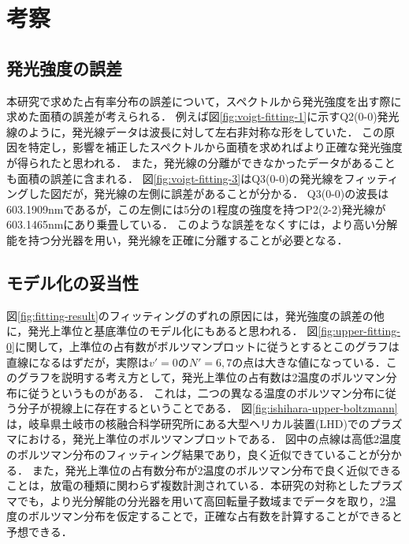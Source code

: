 \chapter{考察}

\section{発光強度の誤差}
本研究で求めた占有率分布の誤差について，スペクトルから発光強度を出す際に求めた面積の誤差が考えられる．
例えば図\ref{fig:voigt-fitting-1}に示すQ2(0-0)発光線のように，発光線データは波長に対して左右非対称な形をしていた．
この原因を特定し，影響を補正したスペクトルから面積を求めればより正確な発光強度が得られたと思われる．
また，発光線の分離ができなかったデータがあることも面積の誤差に含まれる．
図\ref{fig:voigt-fitting-3}はQ3(0-0)の発光線をフィッティングした図だが，発光線の左側に誤差があることが分かる．
Q3(0-0)の波長は603.1909nmであるが，この左側には5分の1程度の強度を持つP2(2-2)発光線が603.1465nmにあり乗畳している\cite{kyokaisou}．
このような誤差をなくすには，より高い分解能を持つ分光器を用い，発光線を正確に分離することが必要となる．

\section{モデル化の妥当性}
図\ref{fig:fitting-result}のフィッティングのずれの原因には，発光強度の誤差の他に，発光上準位と基底準位のモデル化にもあると思われる．
図\ref{fig:upper-fitting-0}に関して，上準位の占有数がボルツマンプロットに従うとするとこのグラフは直線になるはずだが，実際は$v'=0$の$N'=6,7$の点は大きな値になっている．このグラフを説明する考え方として，発光上準位の占有数は2温度のボルツマン分布に従うというものがある．
これは，二つの異なる温度のボルツマン分布に従う分子が視線上に存在するということである．
図\ref{fig:ishihara-upper-boltzmann}は，岐阜県土岐市の核融合科学研究所にある大型ヘリカル装置(LHD)でのプラズマにおける，発光上準位のボルツマンプロットである\cite{ishihara}．
図中の点線は高低2温度のボルツマン分布のフィッティング結果であり，良く近似できていることが分かる．
また，発光上準位の占有数分布が2温度のボルツマン分布で良く近似できることは，放電の種類に関わらず複数計測されている\cite{ishihara, two-temperature-1, two-temperature-2}．本研究の対称としたプラズマでも，より光分解能の分光器を用いて高回転量子数域までデータを取り，2温度のボルツマン分布を仮定することで，正確な占有数を計算することができると予想できる．